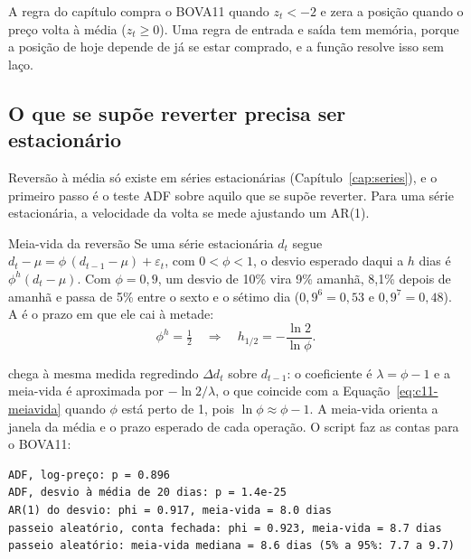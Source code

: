 A regra do capítulo compra o BOVA11 quando $z_t < -2$ e zera a posição quando o preço volta à média ($z_t \ge 0$). Uma regra de entrada e saída tem memória, porque a posição de hoje depende de já se estar comprado, e a função  resolve isso sem laço.



\subsection{O que se supõe reverter precisa ser estacionário}

Reversão à média só existe em séries estacionárias (Capítulo~\ref{cap:series}), e o primeiro passo é o teste ADF sobre aquilo que se supõe reverter. Para uma série estacionária, a velocidade da volta se mede ajustando um AR(1).

\begin{resultado}{Meia-vida da reversão}
Se uma série estacionária $d_t$ segue $d_t - \mu = \phi\,(d_{t-1} - \mu) + \varepsilon_t$, com $0 < \phi < 1$, o desvio esperado daqui a $h$ dias é $\phi^h (d_t - \mu)$. Com $\phi = 0,9$, um desvio de 10\% vira 9\% amanhã, 8,1\% depois de amanhã e passa de 5\% entre o sexto e o sétimo dia ($0,9^6 = 0,53$ e $0,9^7 = 0,48$). A  é o prazo em que ele cai à metade:
\begin{equation}
  \phi^{h} = \tfrac{1}{2} \quad\Longrightarrow\quad h_{1/2} = -\frac{\ln 2}{\ln \phi} .
  \label{eq:c11-meiavida}
\end{equation}
\end{resultado}

\citet{chan2013} chega à mesma medida regredindo $\Delta d_t$ sobre $d_{t-1}$: o coeficiente é $\lambda = \phi - 1$ e a meia-vida é aproximada por $-\ln 2 / \lambda$, o que coincide com a Equação~\eqref{eq:c11-meiavida} quando $\phi$ está perto de 1, pois $\ln \phi \approx \phi - 1$. A meia-vida orienta a janela da média e o prazo esperado de cada operação. O script  faz as contas para o BOVA11:

\begin{lstlisting}[style=saida]
ADF, log-preço: p = 0.896
ADF, desvio à média de 20 dias: p = 1.4e-25
AR(1) do desvio: phi = 0.917, meia-vida = 8.0 dias
passeio aleatório, conta fechada: phi = 0.923, meia-vida = 8.7 dias
passeio aleatório: meia-vida mediana = 8.6 dias (5% a 95%: 7.7 a 9.7)
\end{lstlisting}

